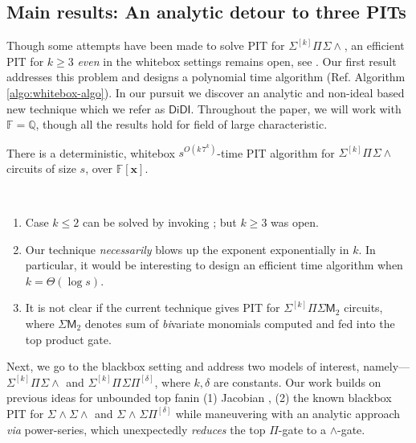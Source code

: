\documentclass[10pt,a4paper]{article}
\newcommand{\F}{\mathbb{F}}
\newcommand{\Q}{\mathbb{Q}}
\newcommand{\x}{{\boldsymbol x}}
\newcommand{\SPSP}[3]{\Sigma^{#1}\Pi^{#2}\Sigma\Pi^{#3}}
\newcommand{\SWSP}[3]{\Sigma^{#1}\!\wedge^{#2}\!\Sigma\Pi^{#3}}
\newcommand{\SPSU}[3]{\Sigma^{#1} \Pi^{#2} \Sigma \wedge^{#3}}
\newcommand{\SWSU}[2]{\Sigma^{#1}\!\wedge\!\Sigma\!\wedge^{#2}}
\numberwithin{equation}{section}
\begin{document}
\vspace*{1em}
\subsection{Main results: An analytic detour to three PITs}
Though some attempts have been made to solve PIT for $\SPSU{[k]}{}{}$, an efficient PIT for $k \ge 3$  \emph{even} in the whitebox settings remains open, see \cite[Open Prob.~2]{saha2013case}. Our first result addresses this problem and designs a polynomial time algorithm (Ref. Algorithm \ref{algo:whitebox-algo}). In our pursuit we discover an analytic and non-ideal based new technique which we refer as $\mathsf{DiDI}$. Throughout the paper, we will work with $\F=\Q$, though all the results hold for field of large characteristic. 


\begin{theorem}[Whitebox $\SPSU{[k]}{}{}$ PIT] \label{thm:thm1}
There is a deterministic, whitebox $s^{O(k\,7^k)}$-time PIT algorithm for $\SPSU{[k]}{}{}$ circuits of size $s$, over $\F[\x]$.
\end{theorem}


\begin{remark*} ~ 
    \begin{enumerate}
        \item Case $k \le 2$ can be solved by invoking \cite[Theorem 5.2]{saha2013case}; but $k \ge3$ was open.
        \item Our technique \emph{necessarily} blows up the exponent exponentially in $k$. In particular, it would be interesting to design an efficient time algorithm when $k=\Theta(\log s)$.
        \item It is not clear if the current technique gives PIT for $\Sigma^{[k]}\Pi\Sigma\mathsf{M}_2$ circuits, where \(\Sigma\mathsf{M}_2\) denotes sum of {\em bi}variate monomials computed and fed into the top product gate.
%
    \end{enumerate}
\end{remark*}

Next, we go to the blackbox setting and address two models of interest, namely--- $\SPSU{[k]}{}{}$ and $\SPSP{[k]}{}{[\delta]}$, where $k, \delta$ are constants. Our work builds on previous ideas for unbounded top fanin (1) Jacobian \cite{agrawal2016jacobian}, (2) the known blackbox PIT for $\SWSU{}{}{}$ and $\SWSP{}{}{[\delta]}$ \cite{gurjarARO,forbes2015deterministic} while maneuvering with an analytic approach \emph{via} power-series, which unexpectedly \emph{reduces} the top $\Pi$-gate to a $\wedge$-gate.
\end{document}
